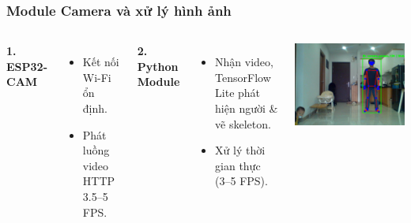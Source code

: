 \begin{frame}[t]
\frametitle{Module Camera và xử lý hình ảnh}
\begin{columns}[T]
    \textbf{1. ESP32-CAM}
    \begin{itemize}
        \item Kết nối Wi-Fi ổn định.
        \item Phát luồng video HTTP 3.5–5 FPS.
    \end{itemize}
    \textbf{2. Python Module}
    \begin{itemize}
        \item Nhận video, TensorFlow Lite phát hiện người & vẽ skeleton.
        \item Xử lý thời gian thực (3–5 FPS).
    \end{itemize}

    \centering
    \includegraphics[width=\linewidth]{images/fall_detection_screen_shoot.png}
\end{columns}
\end{frame}

